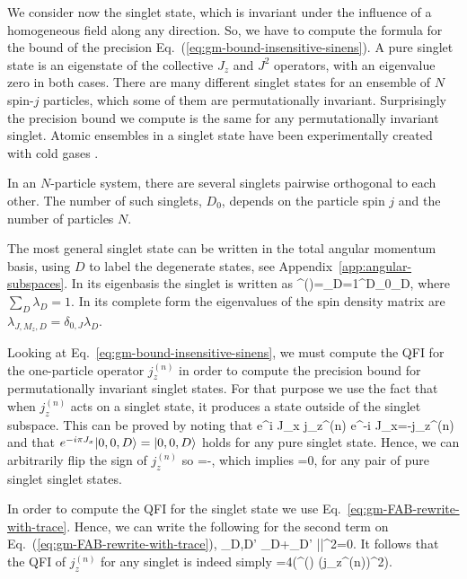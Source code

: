 We consider now the singlet state, which is invariant under the influence
of a homogeneous field along any direction.
So, we have to compute the formula for the bound of the precision Eq.~(\ref{eq:gm-bound-insensitive-sinens}).
A pure singlet state is an eigenstate of the collective $J_z$ and $J^2$
operators, with an eigenvalue zero in both cases.
There are many different singlet states for an ensemble of $N$
spin-$j$ particles, which some of them are permutationally invariant.
Surprisingly the precision bound we compute is the same
for any permutationally invariant singlet.
Atomic ensembles in a singlet state have been experimentally
created with cold gases \cite{Toth2010, Behbood2014}.

In an $N$-particle system, there are several singlets pairwise orthogonal to each other.
The number of such singlets, $D_0$, depends on the particle spin $j$ and the number of particles $N$.

The most general singlet state can be written in the total angular momentum basis, using $D$ to label the degenerate states, see Appendix~\ref{app:angular-subspaces}.
In its eigenbasis the singlet is written as
\be
\rho^{()}=\sum_{D=1}^{D_0}\lambda_D,
\label{eq:gm-general-singlet}
\ee
where $\sum_D \lambda_D=1$.
In its complete form the eigenvalues of the spin density matrix are $\lambda_{J,M_z,D}=\delta_{0,J}\lambda_D$.

Looking at Eq.~\eqref{eq:gm-bound-insensitive-sinens},
we must compute the QFI for the one-particle operator $j_z^{(n)}$ in order to compute the precision bound for permutationally invariant singlet states.
For that purpose we use the fact that when $j_z^{(n)}$ acts on a singlet state, it produces a state outside of the singlet subspace.
This can be proved by noting that
\be
  e^{i \pi J_x} j_z^{(n)} e^{-i \pi J_x}=-j_z^{(n)}
\ee
and that $e^{-i\pi J_x} \vert{0,0,D}\rangle = \vert{0,0,D}\rangle$
holds for any pure singlet state.
Hence, we can arbitrarily flip the sign of $j_z^{(n)}$ so
\be
  =-,
\ee
which implies
\be
  =0,
  \label{eq:gm-expectation-jzn-for-singlets}
\ee
for any pair of pure singlet singlet states.

In order to compute the QFI for the singlet state we use
Eq.~\eqref{eq:gm-FAB-rewrite-with-trace}.
Hence, we can write the following for the second term on Eq.~(\ref{eq:gm-FAB-rewrite-with-trace}),
\sum_{D,D'}
  {\lambda_D+\lambda_{D'}}
  ||^2=0.
\ee
It follows that the QFI of $j_z^{(n)}$ for any singlet is indeed simply
\be
  \label{eq:gm-qfi-as-trace-singlet}
  =4\tr({\rho^{()} (j_z^{(n)})^2}).
\ee

